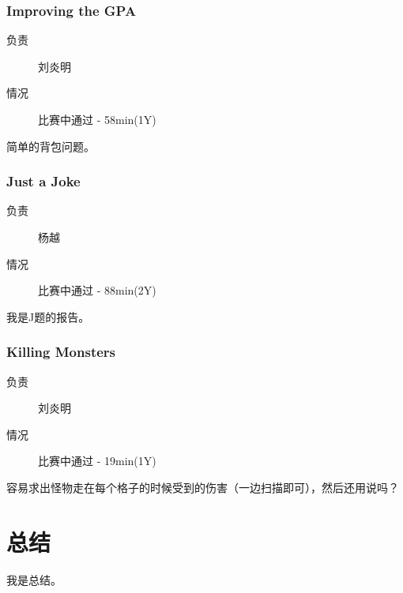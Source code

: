 \documentclass[a4paper, 11pt, nofonts, nocap, fancyhdr]{ctexart}
\newcommand{\problem}[1]{\subsubsection{#1}}
\begin{document}
\problem{Improving the GPA}

\begin{description}
\item[负责] 刘炎明
\item[情况] 比赛中通过 - 58min(1Y)
\end{description}

简单的背包问题。

\problem{Just a Joke}

\begin{description}
\item[负责] 杨越
\item[情况] 比赛中通过 - 88min(2Y)
\end{description}

我是J题的报告。

\problem{Killing Monsters}

\begin{description}
\item[负责] 刘炎明
\item[情况] 比赛中通过 - 19min(1Y)
\end{description}

容易求出怪物走在每个格子的时候受到的伤害（一边扫描即可），然后还用说吗？

\section{总结}

我是总结。
\end{document}
